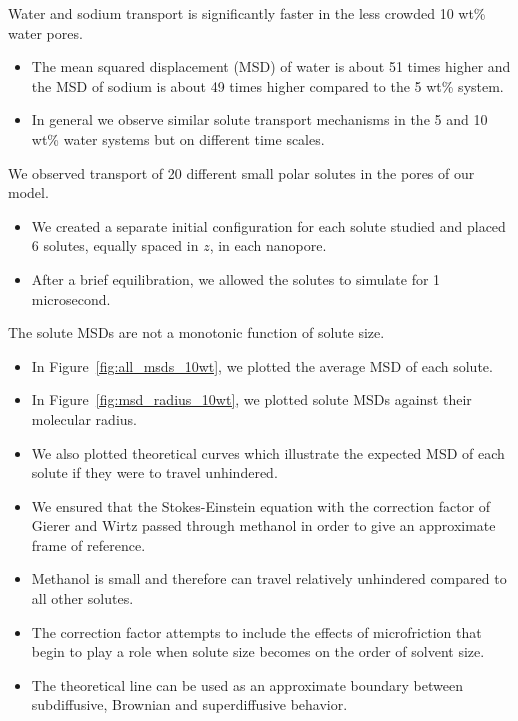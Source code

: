 \documentclass{article}
\begin{document}
  \noindent Water and sodium transport is significantly faster in the less
  crowded 10 wt\% water pores. 
  \begin{itemize}
    \item The mean squared displacement (MSD) of water is about 51 times 
    higher and the MSD of sodium is about 49 times higher compared to the 5 wt\% system.
    \item In general we observe similar solute transport mechanisms in the 5
    and 10 wt\% water systems but on different time scales.
  \end{itemize}
  
  \noindent We observed transport of 20 different small polar solutes in the
  pores of our model. 
  \begin{itemize}
    \item We created a separate initial configuration for each solute studied and
    placed 6 solutes, equally spaced in $z$, in each nanopore.
    \item After a brief equilibration, we allowed the solutes to simulate for
    1 microsecond. 
  \end{itemize}
  
  \noindent The solute MSDs are not a monotonic function of solute size.
  \begin{itemize}
    \item In Figure~\ref{fig:all_msds_10wt}, we plotted the average
    MSD of each solute. 
    \item In Figure~\ref{fig:msd_radius_10wt}, we plotted solute
    MSDs against their molecular radius.
    \item We also plotted theoretical curves which illustrate the 
    expected MSD of each solute if they were to travel unhindered.
    \item We ensured that the Stokes-Einstein equation with the
    correction factor of Gierer and Wirtz\cite{gierer_molekulare_1953}
    passed through methanol in order to give an approximate frame of reference. 
    \item Methanol is small and therefore can travel relatively
    unhindered compared to all other solutes.
    \item The correction factor attempts to include the effects of
    microfriction that begin to play a role when solute size becomes
    on the order of solvent size.
    \item The theoretical line can be used as an approximate boundary
    between subdiffusive, Brownian and superdiffusive behavior.
  \end{itemize}
  
\end{document}
